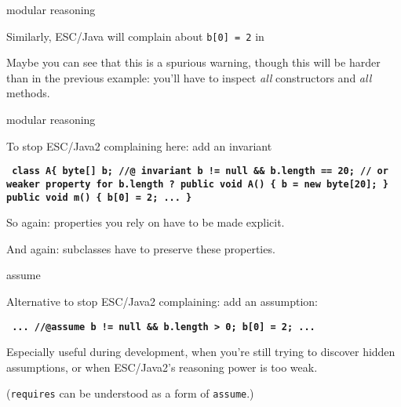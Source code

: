 \documentclass[
pdf,
nocolorBG,
slideColor,
cok,
]{prosper}
\newcommand{\code}[1]{{\rm \texttt{\textbf{\scriptsize #1}}}}
\begin{document}
\begin{slide}{modular reasoning}
\vspace*{-6ex}

Similarly, ESC/Java will complain about \texttt{b[0] = 2} in

Maybe you can see that this is a spurious warning, though this will be
harder than in the previous example: you'll have to inspect {\em all}
constructors and {\em all} methods.

\end{slide}

\begin{slide}{modular reasoning}
\vspace*{-6ex}

To stop ESC/Java2 complaining here: add an invariant

\begin{alltt}\code{ class A\{
  byte[] b;
  {\green //@ invariant b != null && b.length == 20;}
  {\green     // or weaker property for b.length ?}
  public void A() \{ b = new byte[20]; \}
  public void m() \{ b[0] = 2;
                    ...  \}
}
\end{alltt} %

So again: properties you rely on have to be made explicit.

\medskip

And again: subclasses have to preserve these properties.

\end{slide}

\begin{slide}{assume}
\vspace*{-6ex}

Alternative to stop ESC/Java2 complaining: add an assumption:
\begin{alltt}\code{ 
    ...
    //@{\blue assume} b != null && b.length > 0;
    b[0] = 2;
    ...  
}
\end{alltt}

Especially useful during development, when you're still trying to
discover hidden assumptions, or when ESC/Java2's reasoning power is
too weak.

\medskip

(\texttt{requires} can be understood as a form of \texttt{assume}.)

\end{slide}
\end{document}

